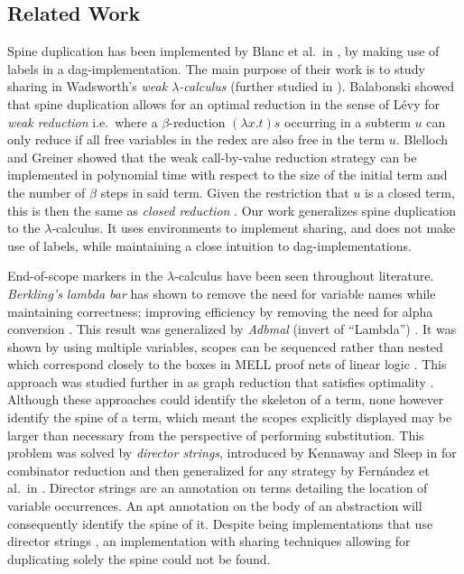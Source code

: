 \documentclass[a4paper,UKenglish,cleveref, autoref]{lipics-v2019}
\begin{document}
\subsection{Related Work}

Spine duplication has been implemented by Blanc et al.\ in \cite{blanc2007sharing}, by making use of labels in a dag-implementation. The main purpose of their work is to study sharing in Wadsworth's \emph{weak $\lambda$-calculus} \cite{wadsworth1971semantics} (further studied in \cite{CAGMAN1998239}). Balabonski \cite{Balabonski12} showed that spine duplication allows for an optimal reduction in the sense of L\'{e}vy \cite{levy1980optimal} for \emph{weak reduction} i.e.\ where a $\beta$-reduction $(\lambda x . t) s$ occurring in a subterm $u$ can only reduce if all free variables in the redex are also free in the term $u$. Blelloch and Greiner \cite{Blelloch:1995:PSF:224164.224210} showed that the weak call-by-value reduction strategy can be implemented in polynomial time with respect to the size of the initial term and the number of $\beta$ steps in said term. Given the restriction that $u$ is a closed term, this is then the same as \emph{closed reduction} \cite{fernandez1999closed, fernandez2005closed}. Our work generalizes spine duplication to the $\lambda$-calculus. It uses environments to implement sharing, and does not make use of labels, while maintaining a close intuition to dag-implementations.

End-of-scope markers in the $\lambda$-calculus have been seen throughout literature. \emph{Berkling's lambda bar} \cite{berkling1976symmetric} has shown to remove the need for variable names while maintaining correctness; improving efficiency by removing the need for alpha conversion \cite{BERKLING198289}. This result was generalized by \emph{Adbmal} (invert of ``Lambda'') \cite{hendriks2003lambda}. It was shown by using multiple variables, scopes can be sequenced rather than nested which correspond closely to the boxes in MELL proof nets of linear logic \cite{Lafont94fromproof-nets}. This approach was studied further in \cite{van2004lambdascope} as graph reduction that satisfies optimality \cite{levy1980optimal}. Although these approaches could identify the skeleton of a term, none however identify the spine of a term, which meant the scopes explicitly displayed may be larger than necessary from the perspective of performing substitution. This problem was solved by \emph{director strings}, introduced by Kennaway and Sleep in \cite{kennaway1988director} for combinator reduction and then generalized for any strategy by Fern\'{a}ndez et al.\ in \cite{fernandez2005lambda}. Director strings are an annotation on terms detailing the location of variable occurrences. An apt annotation on the body of an abstraction will consequently identify the spine of it. Despite being implementations that use director strings \cite{sinot2003efficient, fernandez2005lambda, fernandez2005closed}, an implementation with sharing techniques allowing for duplicating solely the spine could not be found.
\end{document}
